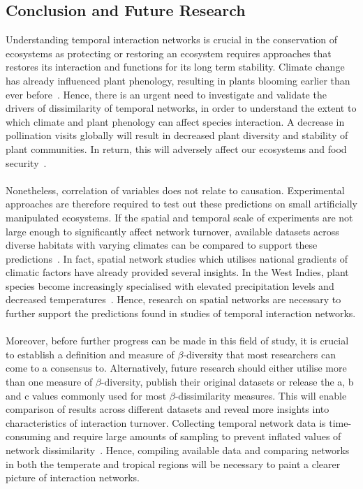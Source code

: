 \documentclass[11pt]{article}
\begin{document}
\subsection{Conclusion and Future Research}
Understanding temporal interaction networks is crucial in the conservation of ecosystems as protecting or restoring an ecosystem requires approaches that restores its interaction and functions for its long term stability. Climate change has already influenced plant phenology, resulting in plants blooming earlier than ever before~\citep{Cleland2007,Miller-Rushing2008}. Hence, there is an urgent need to investigate and validate the drivers of dissimilarity of temporal networks, in order to understand the extent to which climate and plant phenology can affect species interaction. A decrease in pollination visits globally will result in decreased plant diversity and stability of plant communities. In return, this will adversely affect our ecosystems and food security~\citep{Schweiger2010, Burkle2011}. \\
\\
Nonetheless, correlation of variables does not relate to causation. Experimental approaches are therefore required to test out these predictions on small artificially manipulated ecosystems. If the spatial and temporal scale of experiments are not large enough to significantly affect network turnover, available datasets across diverse habitats with varying climates can be compared to support these predictions~\citep{Burkle2009, Burkle2011}. In fact, spatial network studies which utilises national gradients of climatic factors have already provided several insights. In the West Indies, plant species become increasingly specialised with elevated precipitation levels and decreased temperatures~\citep{MartinGonzalez2009}. Hence, research on spatial networks are necessary to further support the predictions found in studies of temporal interaction networks.\\
\\
Moreover, before further progress can be made in this field of study, it is crucial to establish a definition and measure of $\beta$-diversity that most researchers can come to a consensus to. Alternatively, future research should either utilise more than one measure of $\beta$-diversity, publish their original datasets or release the a, b and c values commonly used for most $\beta$-dissimilarity measures. This will enable comparison of results across different datasets and reveal more insights into characteristics of interaction turnover. Collecting temporal network data is time-consuming and require large amounts of sampling to prevent inflated values of network dissimilarity~\citep{Koleff2003, Burkle2011, Poisot2015}. Hence, compiling available data and comparing networks in both the temperate and tropical regions will be necessary to paint a clearer picture of interaction networks. \\
\end{document}
